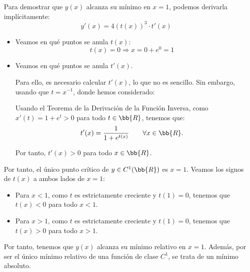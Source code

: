 \documentclass[12pt]{article}
\begin{document}
\begin{ejercicio}
    Para demostrar que $y(x)$ alcanza su mínimo en $x=1$, podemos derivarla implícitamente:
    \begin{equation*}
        y'(x) = 4(t(x))^3\cdot t'(x)
    \end{equation*}
    \begin{itemize}
        \item Veamos en qué puntos se anula $t(x)$:
        \begin{equation*}
            t(x)=0\Longrightarrow x=0+e^0=1
        \end{equation*}

        \item Veamos en qué puntos se anula $t'(x)$.
        
        Para ello, es necesario calcular $t'(x)$, lo que no es sencillo. Sin embargo, usando que $t=x^{-1}$, donde hemos considerado:

        Usando el Teorema de la Derivación de la Función Inversa, como $x'(t)=1+e^t>0$ para todo $t\in \bb{R}$, tenemos que:
        \begin{equation*}
            t'(x)=\dfrac{1}{1+e^{t(x)}} \qquad \forall x\in \bb{R}.
        \end{equation*}

        Por tanto, $t'(x)>0$ para todo $x\in \bb{R}$.
    \end{itemize}

    Por tanto, el único punto crítico de $y\in C^1(\bb{R})$ es $x=1$. Veamos los signos de $t(x)$ a ambos lados de $x=1$:
    \begin{itemize}
        \item Para $x<1$, como $t$ es estrictamente creciente y $t(1)=0$, tenemos que $t(x)<0$ para todo $x<1$.
        \item Para $x>1$, como $t$ es estrictamente creciente y $t(1)=0$, tenemos que $t(x)>0$ para todo $x>1$.
    \end{itemize}

    Por tanto, tenemos que $y(x)$ alcanza su mínimo relativo en $x=1$. Además, por ser el único mínimo relativo de una función de clase $C^1$, se trata de un mínimo absoluto.
\end{ejercicio}
\end{document}
